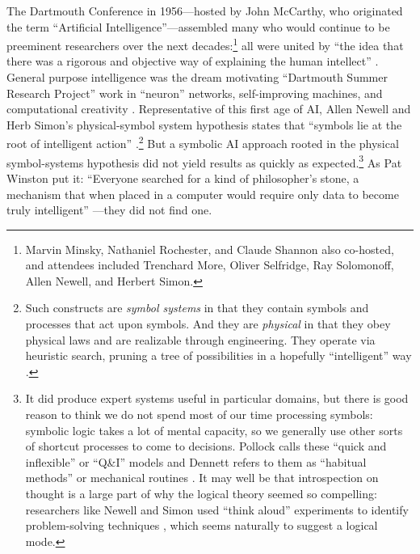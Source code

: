 The Dartmouth
Conference in 1956---hosted by John McCarthy, who originated
  the term ``Artificial Intelligence''---assembled many who would continue to
be preeminent researchers over the next decades:\footnote{Marvin Minsky, Nathaniel Rochester, and
Claude Shannon also co-hosted, and attendees included Trenchard More, Oliver Selfridge,
Ray Solomonoff, Allen Newell, and Herbert Simon.} all were united by
``the idea that there was a rigorous and objective way of explaining
the human intellect'' \cite[Ch. 5]{mccorduck}. General purpose
intelligence was the dream motivating ``Dartmouth Summer Research
Project'' work in ``neuron'' networks,
self-improving machines, and computational creativity
\cite{dartmouthconf}. Representative of this first age of AI, Allen Newell and Herb Simon's
physical-symbol system hypothesis states that ``symbols lie at the root of 
intelligent action'' \cite[p. 109]{newellsimon}.\footnote{Such
constructs are \emph{symbol systems} in that they contain symbols and processes
that act upon symbols. And they are \emph{physical} in that they obey
physical laws and are realizable through engineering. They operate via
heuristic search, pruning a tree of possibilities in a hopefully
``intelligent'' way \cite[p. 124]{newellsimon}.} But a symbolic AI
approach rooted in the physical symbol-systems hypothesis did not
yield results as quickly as expected.\footnote{It did produce
  expert systems useful in particular domains, but there is good
  reason to think we do not spend most of our time processing symbols:
  symbolic logic takes a lot of mental capacity, so we generally use
  other sorts of shortcut processes to come to decisions. Pollock
  calls these ``quick and inflexible'' or ``Q\&I'' models \cite[p.
    120]{pollock} and Dennett refers to them as ``habitual methods''
  or mechanical routines \cite[p. 157]{dennett}.
It may well be that introspection on thought is a large part of why the logical theory seemed so
compelling: researchers like Newell and Simon used ``think aloud''
experiments to identify problem-solving techniques \cite[Ch.
  10]{mccorduck}, which seems naturally to suggest a logical mode.} As
Pat Winston put it: ``Everyone searched for a kind of philosopher's
stone, 
a mechanism that when placed in a computer would require only data to
become truly intelligent'' \cite[p. 4]{winston}---they did not find one.

